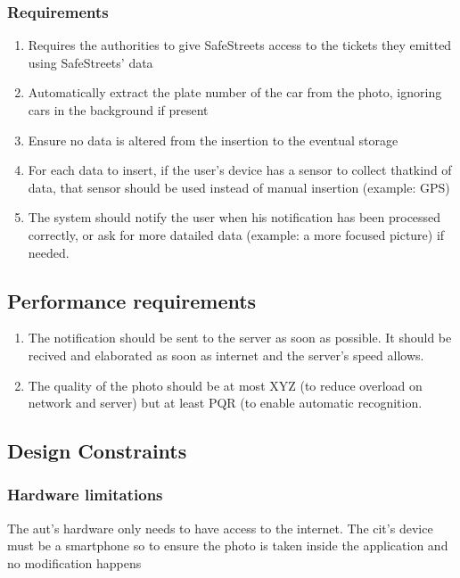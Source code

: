 \documentclass{article}
\newcommand{\enum}[1]{\texttt{#1.\arabic*}}
\begin{document}
		\subsubsection{Requirements}
		
			\begin{enumerate}[label=\enum{R}]
				\item \label{G_storeTickets}Requires the authorities to give SafeStreets access to the tickets they emitted using SafeStreets' data
				\item Automatically extract the plate number of the car from the photo, ignoring cars in the background if present
				\item Ensure no data is altered from the insertion to the eventual storage
				\item For each data to insert, if the  user's device has a sensor to collect thatkind of data, that sensor should be used instead of manual insertion (example: GPS)
				\item The system should notify the user when his notification has been processed correctly, or ask for more datailed data (example: a more focused picture) if needed.
			\end{enumerate}
			
	\subsection{Performance requirements}
		\begin{enumerate}
			\item The notification should be sent to the server as soon as possible. It should be recived and elaborated as soon as internet and the server's speed allows.
			\item The quality of the photo should be at most XYZ (to reduce overload on network and server) but at least PQR (to enable automatic recognition.
		\end{enumerate}
		
	\subsection{Design Constraints}
	
		\subsubsection{Hardware limitations} The aut's hardware only needs to have access to the internet. The cit's device must be a smartphone so to ensure the photo is taken inside the application and no modification happens
		
\end{document}

